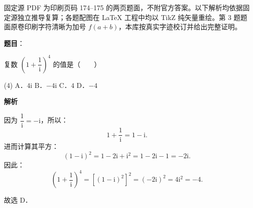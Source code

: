

\begin{gktip}
固定源 PDF 为印刷页码 174–175 的两页题面，不附官方答案。以下解析均依据固定源独立推导复算；各题配图在 LaTeX 工程中均以 TikZ 纯矢量重绘。第 3 题题面原卷印刷字符清晰为加号 $f(a+b)$，本库按真实字迹校订并给出完整证明。
\end{gktip}

\begin{answer}

\textbf{题目}：

复数 $\left(1 + \dfrac{1}{\mathrm{i}}\right)^4$ 的值是\mbox{（　　）}

\begin{gkopts}(4)
\task A．$4\mathrm{i}$
\task B．$-4\mathrm{i}$
\task C．$4$
\task D．$-4$
\end{gkopts}

\textbf{解析}

因为 $\dfrac{1}{\mathrm{i}} = -\mathrm{i}$，所以：
\nopagebreak[4]
\[
1 + \frac{1}{\mathrm{i}} = 1 - \mathrm{i}.
\]
进而计算其平方：
\nopagebreak[4]
\[
(1 - \mathrm{i})^2 = 1 - 2\mathrm{i} + \mathrm{i}^2 = 1 - 2\mathrm{i} - 1 = -2\mathrm{i}.
\]
因此：
\nopagebreak[4]
\[
\left(1 + \frac{1}{\mathrm{i}}\right)^4 = \left[(1 - \mathrm{i})^2\right]^2 = (-2\mathrm{i})^2 = 4\mathrm{i}^2 = -4.
\]

故选 D．


\end{answer}
